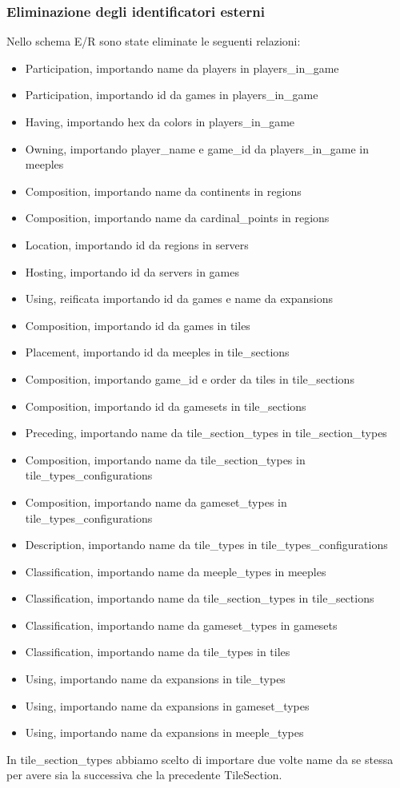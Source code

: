 \subsubsection*{Eliminazione degli identificatori esterni}
Nello schema E/R sono state eliminate le seguenti relazioni:
\begin{itemize}
    \item Participation, importando name da players in players\_in\_game
    \item Participation, importando id da games in players\_in\_game
    \item Having, importando hex da colors in players\_in\_game
    \item Owning, importando player\_name e game\_id da players\_in\_game in meeples
    \item Composition, importando name da continents in regions
    \item Composition, importando name da cardinal\_points in regions
    \item Location, importando id da regions in servers
    \item Hosting, importando id da servers in games
    \item Using, reificata importando id da games e name da expansions
    \item Composition, importando id da games in tiles
    \item Placement, importando id da meeples in tile\_sections
    \item Composition, importando game\_id e order da tiles in tile\_sections
    \item Composition, importando id da gamesets in tile\_sections
    \item Preceding, importando name da tile\_section\_types in tile\_section\_types
    \item Composition, importando name da tile\_section\_types in tile\_types\_configurations
    \item Composition, importando name da gameset\_types in tile\_types\_configurations
    \item Description, importando name da tile\_types in tile\_types\_configurations
    \item Classification, importando name da meeple\_types in meeples
    \item Classification, importando name da tile\_section\_types in tile\_sections
    \item Classification, importando name da gameset\_types in gamesets
    \item Classification, importando name da tile\_types in tiles
    \item Using, importando name da expansions in tile\_types
    \item Using, importando name da expansions in gameset\_types
    \item Using, importando name da expansions in meeple\_types
\end{itemize}
In tile\_section\_types abbiamo scelto di importare due volte name da se stessa per avere sia la successiva che la precedente TileSection.


